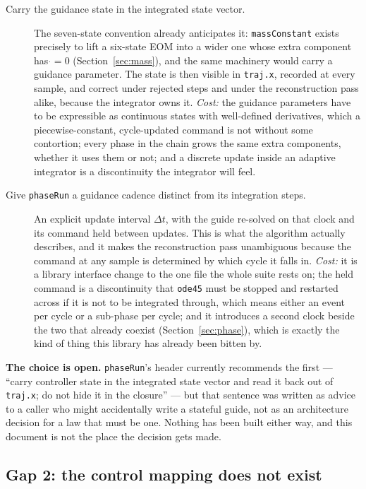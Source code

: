 \documentclass[11pt]{article}
\newcommand{\code}[1]{\texttt{#1}}
\begin{document}
\begin{description}
\item[Carry the guidance state in the integrated state vector.] The
seven-state convention already anticipates it: \code{massConstant} exists
precisely to lift a six-state EOM into a wider one whose extra component has
$\dot{}=0$ (Section~\ref{sec:mass}), and the same machinery would carry a
guidance parameter. The state is then visible in \code{traj.x}, recorded at
every sample, and correct under rejected steps and under the reconstruction
pass alike, because the integrator owns it. \emph{Cost:} the guidance
parameters have to be expressible as continuous states with well-defined
derivatives, which a piecewise-constant, cycle-updated command is not without
some contortion; every phase in the chain grows the same extra components,
whether it uses them or not; and a discrete update inside an adaptive
integrator is a discontinuity the integrator will feel.

\item[Give \code{phaseRun} a guidance cadence distinct from its integration
steps.] An explicit update interval $\Delta t$, with the guide re-solved on
that clock and its command held between updates. This is what the algorithm
actually describes, and it makes the reconstruction pass unambiguous because
the command at any sample is determined by which cycle it falls in.
\emph{Cost:} it is a library interface change to the one file the whole suite
rests on; the held command is a discontinuity that \code{ode45} must be
stopped and restarted across if it is not to be integrated through, which
means either an event per cycle or a sub-phase per cycle; and it introduces a
second clock beside the two that already coexist (Section~\ref{sec:phase}),
which is exactly the kind of thing this library has already been bitten by.
\end{description}

\textbf{The choice is open.} \code{phaseRun}'s header currently recommends the
first --- ``carry controller state in the integrated state vector and read it
back out of \code{traj.x}; do not hide it in the closure'' --- but that
sentence was written as advice to a caller who might accidentally write a
stateful guide, not as an architecture decision for a law that must be one.
Nothing has been built either way, and this document is not the place the
decision gets made.

\subsection{Gap 2: the control mapping does not exist}
\end{document}
